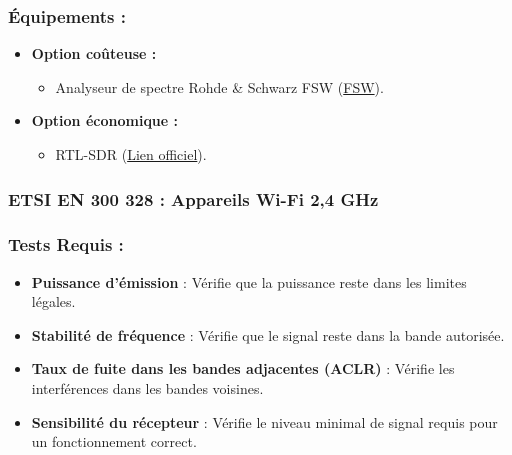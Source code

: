 \documentclass[a4paper,12pt]{article}
\begin{document}
\subsubsection*{Équipements :}
\begin{itemize}
    \item \textbf{Option coûteuse :}
          \begin{itemize}
              \item Analyseur de spectre Rohde \& Schwarz FSW (\href{https://www.rohde-schwarz.com/product/FSW.html}{FSW}).
          \end{itemize}
    \item \textbf{Option économique :}
          \begin{itemize}
              \item RTL-SDR (\href{https://www.rtl-sdr.com/}{Lien officiel}).
          \end{itemize}
\end{itemize}

\subsubsection{ETSI EN 300 328 : Appareils Wi-Fi 2,4 GHz}
\subsubsection*{Tests Requis :}
\begin{itemize}
    \item \textbf{Puissance d’émission} : Vérifie que la puissance reste dans les limites légales.
    \item \textbf{Stabilité de fréquence} : Vérifie que le signal reste dans la bande autorisée.
    \item \textbf{Taux de fuite dans les bandes adjacentes (ACLR)} : Vérifie les interférences dans les bandes voisines.
    \item \textbf{Sensibilité du récepteur} : Vérifie le niveau minimal de signal requis pour un fonctionnement correct.
\end{itemize}
\end{document}
